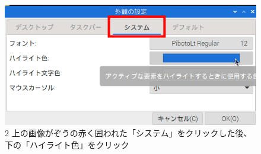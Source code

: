 \documentclass[a4paper,12pt]{jarticle}
\begin{document}
\begin{figure}
\begin{minipage}{\textwidth}
\begin{minipage}{2.582cm}
    \end{minipage}
    \begin{minipage}{0.45\linewidth}
      \includegraphics[width=\linewidth]{textbook-img1001.png}\\
      2 上の{画像}{がぞう}の赤く囲われた「システム」をクリックした後、下の「ハイライト色」をクリック
    \end{minipage}

  \end{minipage}

  \begin{minipage}{\textwidth}


\end{minipage}
\end{figure}
\end{document}
